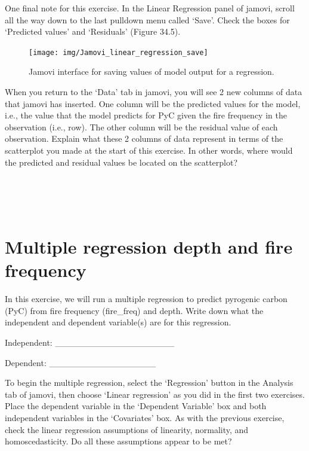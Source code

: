 \documentclass[
]{scrbook}
\begin{document}
One final note for this exercise.
In the Linear Regression panel of jamovi, scroll all the way down to the last pulldown menu called `Save'.
Check the boxes for `Predicted values' and `Residuals' (Figure 34.5).

\begin{figure}
\texttt{[image: img/Jamovi\_linear\_regression\_save]} \caption{Jamovi interface for saving values of model output for a regression.}\label{fig:unnamed-chunk-179}
\end{figure}

When you return to the `Data' tab in jamovi, you will see 2 new columns of data that jamovi has inserted.
One column will be the predicted values for the model, i.e., the value that the model predicts for PyC given the fire frequency in the observation (i.e., row).
The other column will be the residual value of each observation.
Explain what these 2 columns of data represent in terms of the scatterplot you made at the start of this exercise.
In other words, where would the predicted and residual values be located on the scatterplot?

\begin{verbatim}




\end{verbatim}

\hypertarget{multiple-regression-depth-and-fire-frequency}{%
\section{Multiple regression depth and fire frequency}\label{multiple-regression-depth-and-fire-frequency}}

In this exercise, we will run a multiple regression to predict pyrogenic carbon (PyC) from fire frequency (fire\_freq) and depth.
Write down what the independent and dependent variable(s) are for this regression.

Independent: \_\_\_\_\_\_\_\_\_\_\_\_\_\_\_\_\_\_\_

Dependent: \_\_\_\_\_\_\_\_\_\_\_\_\_\_\_\_\_

To begin the multiple regression, select the `Regression' button in the Analysis tab of jamovi, then choose `Linear regression' as you did in the first two exercises.
Place the dependent variable in the `Dependent Variable' box and both independent variables in the `Covariates' box.
As with the previous exercise, check the linear regression assumptions of linearity, normality, and homoscedasticity.
Do all these assumptions appear to be met?
\end{document}

